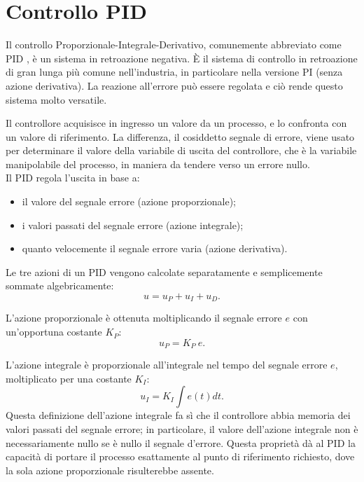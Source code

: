 \documentclass[laurea,oneside,11pt]{USiena_tesiLM3}
\begin{document}
\section{Controllo PID}
Il controllo Proporzionale-Integrale-Derivativo, comunemente abbreviato come PID \cite{testolin2013controllori}, è un sistema in retroazione negativa. È il sistema di controllo in retroazione di gran lunga più comune nell'industria, in particolare nella versione PI (senza azione derivativa). 
La reazione all'errore può essere regolata e ciò rende questo sistema molto versatile.

Il controllore acquisisce in ingresso un valore da un processo, e lo confronta con un valore di riferimento. La differenza, il cosiddetto segnale di errore, viene  usato per determinare il valore della variabile di uscita del controllore, che è la variabile manipolabile del processo, in maniera da tendere verso un errore nullo.\\

Il PID regola l'uscita in base a:
\begin{itemize}
\item il valore del segnale errore (azione proporzionale);
\item i valori passati del segnale errore (azione integrale);
\item quanto velocemente il segnale  errore varia (azione derivativa).
\end{itemize}

Le tre azioni di un PID vengono calcolate separatamente e semplicemente sommate algebricamente:
\begin{equation}
u=u_P + u_I + u_D .
\end{equation}

L'azione proporzionale è ottenuta moltiplicando il segnale errore $e$ con un'opportuna costante $K_P$:
\begin{equation}
u_P = K_P \ e .
\end{equation}

L'azione integrale è proporzionale all'integrale nel tempo del segnale errore $e$, moltiplicato per una costante $K_I$:
\begin{equation}
u_I = K_I \int e(t) dt .
\end{equation}
Questa definizione dell'azione integrale fa sì che il controllore abbia memoria dei valori passati del segnale errore; in particolare, il valore dell'azione integrale non è necessariamente nullo se è nullo il segnale d'errore. Questa proprietà dà al PID la capacità di portare il processo esattamente al punto di riferimento richiesto, dove la sola azione proporzionale risulterebbe assente.
\end{document}
